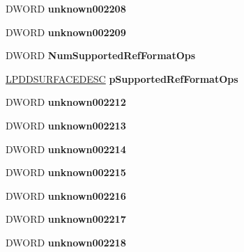 \begin{DoxyCompactItemize}
D\+W\+O\+RD {\bfseries unknown002208}
\item 
\mbox{\label{struct___d_i_r_e_c_t3_d9___i_n_t_a251fa23c534aed25c602a8a44f945a2e}} 
D\+W\+O\+RD {\bfseries unknown002209}
\item 
\mbox{\label{struct___d_i_r_e_c_t3_d9___i_n_t_acddf40d8d853cfb38e5cce6540502ced}} 
D\+W\+O\+RD {\bfseries Num\+Supported\+Ref\+Format\+Ops}
\item 
\mbox{\label{struct___d_i_r_e_c_t3_d9___i_n_t_ab9d9cd658026a614555fd533cd1c1c14}} 
\hyperlink{interfacevoid}{L\+P\+D\+D\+S\+U\+R\+F\+A\+C\+E\+D\+E\+SC} {\bfseries p\+Supported\+Ref\+Format\+Ops}
\item 
\mbox{\label{struct___d_i_r_e_c_t3_d9___i_n_t_acc2835da886279444a2cd919e76eddf7}} 
D\+W\+O\+RD {\bfseries unknown002212}
\item 
\mbox{\label{struct___d_i_r_e_c_t3_d9___i_n_t_a2be484ef862f9243976f176352bbb065}} 
D\+W\+O\+RD {\bfseries unknown002213}
\item 
\mbox{\label{struct___d_i_r_e_c_t3_d9___i_n_t_a0a51a82e68c2555abf6312ffd1b5857b}} 
D\+W\+O\+RD {\bfseries unknown002214}
\item 
\mbox{\label{struct___d_i_r_e_c_t3_d9___i_n_t_a6c99bdc45bb3dfed6d8fdf2dfa25c2fa}} 
D\+W\+O\+RD {\bfseries unknown002215}
\item 
\mbox{\label{struct___d_i_r_e_c_t3_d9___i_n_t_a1001436e049d40f920243853e6f329d1}} 
D\+W\+O\+RD {\bfseries unknown002216}
\item 
\mbox{\label{struct___d_i_r_e_c_t3_d9___i_n_t_a4cb7cad2b721f2787a9a73746f979b49}} 
D\+W\+O\+RD {\bfseries unknown002217}
\item 
\mbox{\label{struct___d_i_r_e_c_t3_d9___i_n_t_aff353e04d9cb9a81648b298fde2dffce}} 
D\+W\+O\+RD {\bfseries unknown002218}

\end{DoxyCompactItemize}

